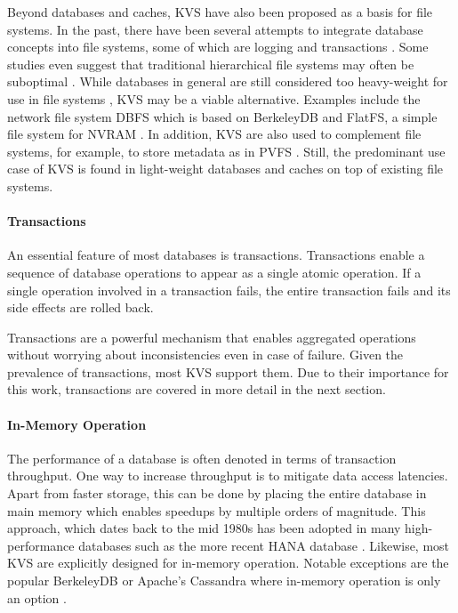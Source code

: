Beyond databases and caches, \ac{KVS} have also been proposed as a basis for
file systems. In the past, there have been several attempts to integrate
database concepts into file systems, some of which are logging
\cite{rosenblum1992design, tweedie1998journaling} and transactions
\cite{seltzer1990transaction, wright2007extending, spillane2009enabling}. Some
studies even suggest that traditional hierarchical file systems may often be
suboptimal \cite{stein2005stupid, seltzer2009hierarchical}. While databases in
general are still considered too heavy-weight for use in file systems
\cite{seltzer2009hierarchical}, \ac{KVS} may be a viable alternative. Examples
include the network file system DBFS which is based on BerkeleyDB
\cite{murphy2002design} and FlatFS, a simple file system for \ac{NVRAM}
\cite{volos2014aerie}. In addition, \ac{KVS} are also used to complement file
systems, for example, to store metadata as in PVFS \cite{carns2009small}. Still,
the predominant use case of \ac{KVS} is found in light-weight databases and
caches on top of existing file systems.

\paragraph{Transactions}

An essential feature of most databases is transactions. Transactions enable a
sequence of database operations to appear as a single atomic operation. If a
single operation involved in a transaction fails, the entire transaction fails
and its side effects are rolled back.

Transactions are a powerful mechanism that enables aggregated operations without
worrying about inconsistencies even in case of failure. Given the prevalence of
transactions, most \ac{KVS} support them. Due to their importance for this work,
transactions are covered in more detail in the next section.


\paragraph{In-Memory Operation}

The performance of a database is often denoted in terms of transaction
throughput. One way to increase throughput is to mitigate data access latencies.
Apart from faster storage, this can be done by placing the entire database in
main memory which enables speedups by multiple orders of magnitude. This
approach, which dates back to the mid 1980s has been adopted in many
high-performance databases such as the more recent HANA database
\cite{molina1992main, faerber2012hana}. Likewise, most \ac{KVS} are explicitly
designed for in-memory operation. Notable exceptions are the popular BerkeleyDB
or Apache's Cassandra where in-memory operation is only an option
\cite{bdb2017doc, lakshman2010cassandra}.

